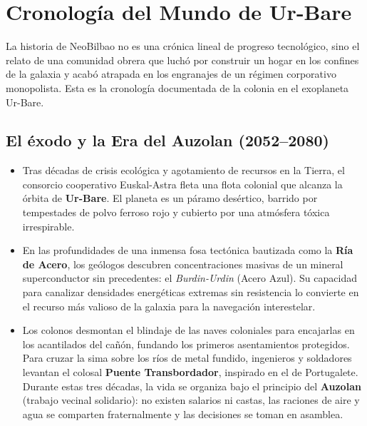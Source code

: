 \chapter{Cronología del Mundo de Ur-Bare}


La historia de NeoBilbao no es una crónica lineal de progreso tecnológico, sino el relato de una comunidad obrera que luchó por construir un hogar en los confines de la galaxia y acabó atrapada en los engranajes de un régimen corporativo monopolista. Esta es la cronología documentada de la colonia en el exoplaneta Ur-Bare.

\section{El éxodo y la Era del Auzolan (2052--2080)}

\begin{itemize}
  \item {} Tras décadas de crisis ecológica y agotamiento de recursos en la Tierra, el consorcio cooperativo Euskal-Astra fleta una flota colonial que alcanza la órbita de \textbf{Ur-Bare}. El planeta es un páramo desértico, barrido por tempestades de polvo ferroso rojo y cubierto por una atmósfera tóxica irrespirable.
  
  \item {} En las profundidades de una inmensa fosa tectónica bautizada como la \textbf{Ría de Acero}, los geólogos descubren concentraciones masivas de un mineral superconductor sin precedentes: el \emph{Burdin-Urdin} (Acero Azul). Su capacidad para canalizar densidades energéticas extremas sin resistencia lo convierte en el recurso más valioso de la galaxia para la navegación interestelar.
  
  \item {} Los colonos desmontan el blindaje de las naves coloniales para encajarlas en los acantilados del cañón, fundando los primeros asentamientos protegidos. Para cruzar la sima sobre los ríos de metal fundido, ingenieros y soldadores levantan el colosal \textbf{Puente Transbordador}, inspirado en el de Portugalete. Durante estas tres décadas, la vida se organiza bajo el principio del \textbf{Auzolan} (trabajo vecinal solidario): no existen salarios ni castas, las raciones de aire y agua se comparten fraternalmente y las decisiones se toman en asamblea.
\end{itemize}


